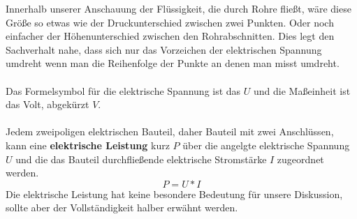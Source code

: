 \documentclass[11pt,a4paper,leqno]{report}
\numberwithin{equation}{chapter}
\begin{document}
Innerhalb unserer Anschauung der Fl\"ussigkeit, die durch Rohre flie\ss{}t, w\"are diese Gr\"o\ss{}e so etwas wie der Druckunterschied zwischen zwei Punkten. Oder noch einfacher der H\"ohenunterschied zwischen den Rohrabschnitten. Dies legt den Sachverhalt nahe, dass sich nur das Vorzeichen der elektrischen Spannung umdreht wenn man die Reihenfolge der Punkte an denen man misst umdreht.\\
\\
Das Formelsymbol f\"ur die elektrische Spannung ist das $U$ und die Ma\ss{}einheit ist das Volt, abgek\"urzt $V$.\\
\\
Jedem zweipoligen elektrischen Bauteil, daher Bauteil mit zwei Anschl\"ussen, kann eine \textbf{elektrische Leistung} kurz $P$ \"uber die angelgte elektrische Spannung $U$ und die das Bauteil durchflie\ss{}ende elektrische Stromst\"arke $I$ zugeordnet werden.
\begin{equation}
	P = U * I
\end{equation} 
Die elektrische Leistung hat keine besondere Bedeutung f\"ur unsere Diskussion, sollte aber der Vollst\"andigkeit halber erw\"ahnt werden.
\end{document}
